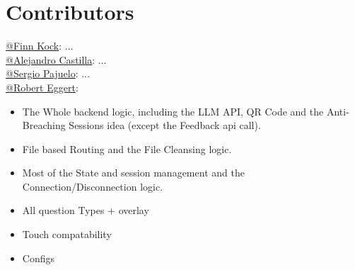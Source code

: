 \section{Contributors}

\href{https://github.com/finnkock}{@Finn Kock}: ... \\
\href{https://github.com/alecasbar}{@Alejandro Castilla}: ...\\
\href{https://github.com/sergioPajuelo}{@Sergio Pajuelo}: ...\\ 
\href{https://github.com/RobertEggert}{@Robert Eggert}: 
\begin{itemize}
    \item The Whole backend logic, including the LLM API, QR Code and the Anti-Breaching Sessions idea (except the Feedback api call).
    \item File based Routing and the File Cleansing logic.
    \item Most of the State and session management and the Connection/Disconnection logic.
    \item All question Types + overlay
    \item Touch compatability
    \item Configs
\end{itemize}